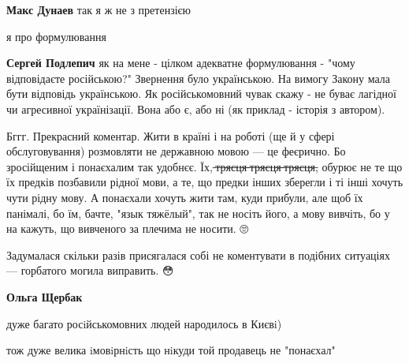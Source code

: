 \begin{itemize}
\begin{itemize}
\textbf{Макс Дунаев} так я ж не з претензією

 
я про формулювання

 
\textbf{Сергей Подлепич} як на мене - цілком адекватне формулювання - "чому
відповідаєте російською?" Звернення було українською. На вимогу Закону мала
бути відповідь українською. Як російськомовний чувак скажу - не буває лагідної
чи агресивної українізації. Вона або є, або ні (як приклад - історія з
автором).

 

Бггг. Прекрасний коментар. Жити в країні і на роботі (ще й у сфері
обслуговування) розмовляти не державною мовою — це феєрично. Бо зросійщеним і
понаєхалим так удобнєє. Їх, ̶т̶р̶я̶с̶ц̶я̶ ̶т̶р̶я̶с̶ц̶я̶ ̶т̶р̶я̶с̶ц̶я̶, обурює не те що їх предків
позбавили рідної мови, а те, що предки інших зберегли і ті інші хочуть чути
рідну мову. А понаєхали хочуть жити там, куди прибули, але щоб їх панімалі, бо
їм, бачте, "язык тяжёлый", так не носіть його, а мову вивчіть, бо у на кажуть,
що вивченого за плечима не носити. 🙄

Задумалася скільки разів присягалася собі не коментувати в подібних ситуаціях —
горбатого могила виправить. 😳


 
\textbf{Ольга Щербак} 

дуже багато росiйськомовних людей народилось в Києвi)

тож дуже велика iмовiрнiсть що нiкуди той продавець не "понаєхал"

\end{itemize}

\end{itemize}

